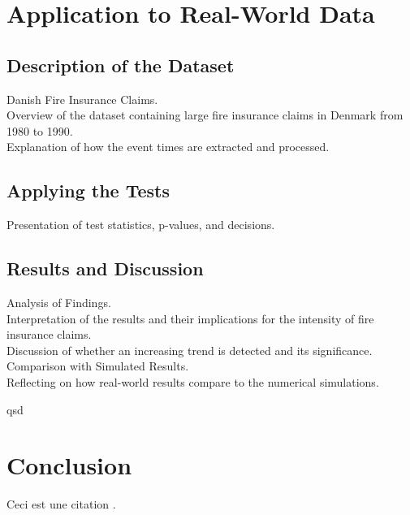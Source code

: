 \documentclass{journalstyle}
\begin{document}
\section{Application to Real-World Data}

\subsection{Description of the Dataset}
Danish Fire Insurance Claims. \\
Overview of the dataset containing large fire insurance claims in Denmark from 1980 to 1990. \\
Explanation of how the event times are extracted and processed.

\subsection{Applying the Tests}
Presentation of test statistics, p-values, and decisions. \\

\subsection{Results and Discussion}
Analysis of Findings. \\
Interpretation of the results and their implications for the intensity of fire insurance claims. \\
Discussion of whether an increasing trend is detected and its significance. \\
Comparison with Simulated Results. \\
Reflecting on how real-world results compare to the numerical simulations.

\newpage qsd



\section{Conclusion}
Ceci est une citation \cite{smith2020example}.



\printbibliography
\end{document}
